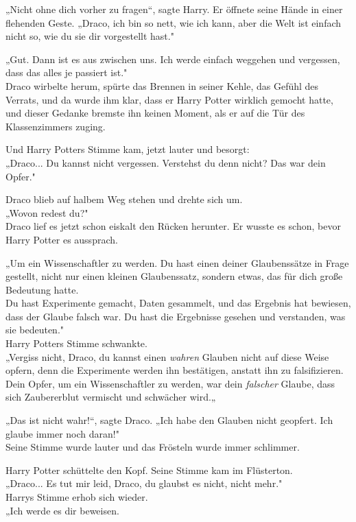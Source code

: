 {„Nicht ohne dich vorher zu fragen“, sagte Harry. Er öffnete seine Hände in einer flehenden Geste. „Draco, ich bin so nett, wie ich kann, aber die Welt ist einfach nicht so, wie du sie dir vorgestellt hast."

„Gut. Dann ist es aus zwischen uns. Ich werde einfach weggehen und vergessen, dass das alles je passiert ist."\\ Draco wirbelte herum, spürte das Brennen in seiner Kehle, das Gefühl des Verrats, und da wurde ihm klar, dass er Harry Potter wirklich gemocht hatte, und dieser Gedanke bremste ihn keinen Moment, als er auf die Tür des Klassenzimmers zuging.

Und Harry Potters Stimme kam, jetzt lauter und besorgt:\\ „Draco... Du kannst nicht vergessen. Verstehst du denn nicht? Das war dein Opfer."

Draco blieb auf halbem Weg stehen und drehte sich um.\\ „Wovon redest du?"\\ Draco lief es jetzt schon eiskalt den Rücken herunter. Er wusste es schon, bevor Harry Potter es aussprach.

„Um ein Wissenschaftler zu werden. Du hast einen deiner Glaubenssätze in Frage gestellt, nicht nur einen kleinen Glaubenssatz, sondern etwas, das für dich große Bedeutung hatte.\\ Du hast Experimente gemacht, Daten gesammelt, und das Ergebnis hat bewiesen, dass der Glaube falsch war. Du hast die Ergebnisse gesehen und verstanden, was sie bedeuten."\\ Harry Potters Stimme schwankte.\\ „Vergiss nicht, Draco, du kannst einen \emph{wahren} Glauben nicht auf diese Weise opfern, denn die Experimente werden ihn bestätigen, anstatt ihn zu falsifizieren.\\ Dein Opfer, um ein Wissenschaftler zu werden, war dein \emph{falscher} Glaube, dass sich Zaubererblut vermischt und schwächer wird.„

„Das ist nicht wahr!“, sagte Draco. „Ich habe den Glauben nicht geopfert. Ich glaube immer noch daran!"\\ Seine Stimme wurde lauter und das Frösteln wurde immer schlimmer.

Harry Potter schüttelte den Kopf. Seine Stimme kam im Flüsterton.\\ „Draco... Es tut mir leid, Draco, du glaubst es nicht, nicht mehr."\\ Harrys Stimme erhob sich wieder.\\ „Ich werde es dir beweisen.

}
